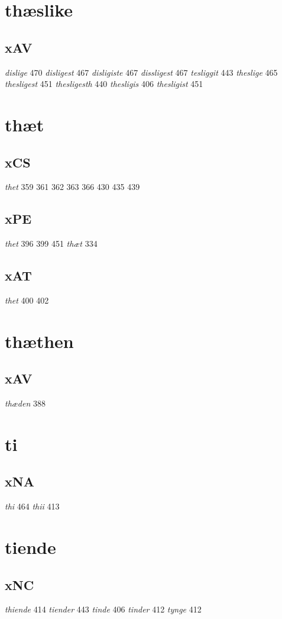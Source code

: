\documentclass[a4paper,twocolumn]{article}
\begin{document}
\section{thæslike}
\label{sec:orgb32fcc7}
\subsection{xAV}
\label{sec:org26e612a}
\emph{dislige} 470 \emph{disligest} 467 \emph{disligiste} 467 \emph{dissligest} 467 \emph{tesliggit} 443 \emph{theslige} 465 \emph{thesligest} 451 \emph{thesligesth} 440 \emph{thesligis} 406 \emph{thesligist} 451 
\section{thæt}
\label{sec:orgfa5f670}
\subsection{xCS}
\label{sec:orgfe07238}
\emph{thet} 359 361 362 363 366 430 435 439 
\subsection{xPE}
\label{sec:orgf4b4b5b}
\emph{thet} 396 399 451 \emph{thæt} 334 
\subsection{xAT}
\label{sec:orgc860180}
\emph{thet} 400 402 
\section{thæthen}
\label{sec:orgf67b86d}
\subsection{xAV}
\label{sec:org976ae87}
\emph{thæden} 388 
\section{ti}
\label{sec:org9dc9813}
\subsection{xNA}
\label{sec:org09bd005}
\emph{thi} 464 \emph{thii} 413 
\section{tiende}
\label{sec:org03b15a7}
\subsection{xNC}
\label{sec:orga493c28}
\emph{thiende} 414 \emph{tiender} 443 \emph{tinde} 406 \emph{tinder} 412 \emph{tynge} 412 
\end{document}
